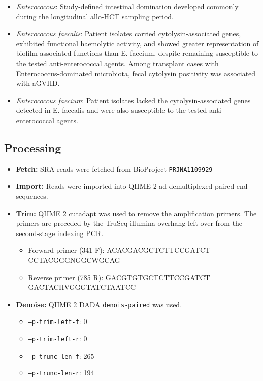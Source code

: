 \documentclass[11pt,a4paper]{article}
\begin{document}
\begin{itemize}
    \item  \textit{Enterococcus}: Study-defined intestinal domination developed commonly during the longitudinal allo-HCT sampling period. 
    \item \textit{Enterococcus faecalis}: Patient isolates carried cytolysin-associated genes, exhibited functional haemolytic activity, and showed greater representation of biofilm-associated functions than E. faecium, despite remaining susceptible to the tested anti-enterococcal agents. Among transplant cases with Enterococcus-dominated microbiota, fecal cytolysin positivity was associated with aGVHD. 
    \item \textit{Enterococcus faecium}: Patient isolates lacked the cytolysin-associated genes detected in E. faecalis and were also susceptible to the tested anti-enterococcal agents. 
\end{itemize}

\subsection{Processing}
\begin{itemize}
\item \textbf{Fetch:} SRA reads were fetched from BioProject \texttt{PRJNA1109929}
\item \textbf{Import:} Reads were imported into QIIME 2 ad demultiplexed paired-end sequences.
\item \textbf{Trim:} QIIME 2 cutadapt was used to remove the amplification primers. The primers are preceded by the TruSeq illumina overhang left over from the second-stage indexing PCR.
  \begin{itemize}
  \item Forward primer (341 F): ACACGACGCTCTTCCGATCT CCTACGGGNGGCWGCAG
  \item Reverse primer (785 R): GACGTGTGCTCTTCCGATCT GACTACHVGGGTATCTAATCC
  \end{itemize}
\item \textbf{Denoise:} QIIME 2 DADA \texttt{denois-paired} was used.
  \begin{itemize}
    \item \texttt{--p-trim-left-f}: 0
  \item \texttt{--p-trim-left-r}: 0
  \item \texttt{--p-trunc-len-f}: 265
  \item \texttt{--p-trunc-len-r}: 194
  \end{itemize}
\end{itemize}
\end{document}
